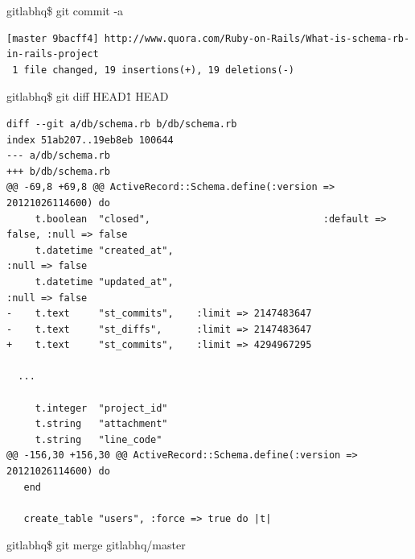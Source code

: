 gitlabhq\$ git commit -a

\begin{lstlisting}
[master 9bacff4] http://www.quora.com/Ruby-on-Rails/What-is-schema-rb-in-rails-project
 1 file changed, 19 insertions(+), 19 deletions(-)
\end{lstlisting}



gitlabhq\$ git diff HEAD\^1 HEAD

\begin{lstlisting}
diff --git a/db/schema.rb b/db/schema.rb
index 51ab207..19eb8eb 100644
--- a/db/schema.rb
+++ b/db/schema.rb
@@ -69,8 +69,8 @@ ActiveRecord::Schema.define(:version => 20121026114600) do
     t.boolean  "closed",                              :default => false, :null => false
     t.datetime "created_at",                                             :null => false
     t.datetime "updated_at",                                             :null => false
-    t.text     "st_commits",    :limit => 2147483647
-    t.text     "st_diffs",      :limit => 2147483647
+    t.text     "st_commits",    :limit => 4294967295

  ...

     t.integer  "project_id"
     t.string   "attachment"
     t.string   "line_code"
@@ -156,30 +156,30 @@ ActiveRecord::Schema.define(:version => 20121026114600) do
   end
 
   create_table "users", :force => true do |t|
\end{lstlisting}


gitlabhq\$ git merge gitlabhq/master

